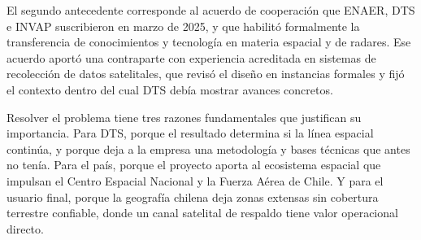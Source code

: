 El segundo antecedente corresponde al acuerdo de cooperación que ENAER, DTS e INVAP suscribieron en marzo de 2025, y que habilitó formalmente la transferencia de conocimientos y tecnología en materia espacial y de radares. Ese acuerdo aportó una contraparte con experiencia acreditada en sistemas de recolección de datos satelitales, que revisó el diseño en instancias formales y fijó el contexto dentro del cual DTS debía mostrar avances concretos.

Resolver el problema tiene tres razones fundamentales que justifican su importancia. Para DTS, porque el resultado determina si la línea espacial continúa, y porque deja a la empresa una metodología y bases técnicas que antes no tenía. Para el país, porque el proyecto aporta al ecosistema espacial que impulsan el Centro Espacial Nacional y la Fuerza Aérea de Chile. Y para el usuario final, porque la geografía chilena deja zonas extensas sin cobertura terrestre confiable, donde un canal satelital de respaldo tiene valor operacional directo.
